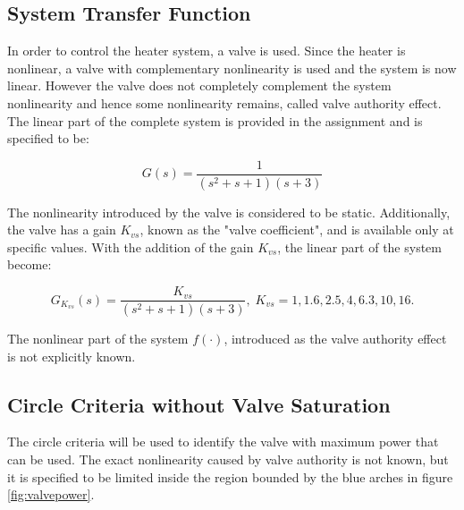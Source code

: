\documentclass[a4paper, titlepage]{article}
\begin{document}
\subsection{System Transfer Function}
In order to control the heater system, a valve is used.
Since the heater is nonlinear, a valve with complementary nonlinearity is used and the system is now linear.
However the valve does not completely complement the system nonlinearity and hence some nonlinearity remains, called valve authority effect.
The linear part of the complete system is provided in the assignment and is specified to be:

\begin{equation}
	G(s) = \frac{1}{(s^2+s+1)(s+3)}
	\label{equ:system}
\end{equation}

The nonlinearity introduced by the valve is considered to be static.  Additionally, the valve has a gain $K_{vs}$, known as the "valve coefficient", and is available only at specific values.
With the addition of the gain $K_{vs}$, the linear part of the system become:

\begin{equation}
	G_{K_{vs}}(s) = \frac{K_{vs}}{(s^2+s+1)(s+3)}, \; K_{vs}=1, 1.6, 2.5, 4, 6.3, 10, 16.
	\label{equ:systemTF}
\end{equation}

The nonlinear part of the system $f(\cdot)$, introduced as the valve authority effect is not explicitly known.

\subsection{Circle Criteria without Valve Saturation}

The circle criteria will be used to identify the valve with maximum power that can be used.  The exact nonlinearity caused by valve authority is not known, but it is specified to be limited inside the region bounded by the blue arches in figure \ref{fig:valvepower}.
\end{document}
